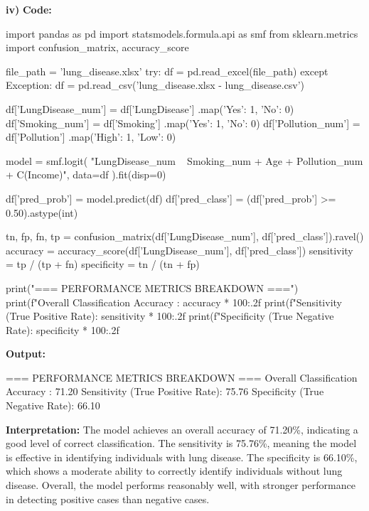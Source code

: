 \documentclass[12pt,a4paper]{article}
\begin{document}
\textbf{iv)}
\textbf{Code:}
\begin{codebox}
import pandas as pd
import statsmodels.formula.api as smf
from sklearn.metrics import confusion_matrix, accuracy_score

file_path = 'lung_disease.xlsx'
try:
    df = pd.read_excel(file_path)
except Exception:
    df = pd.read_csv('lung_disease.xlsx - lung_disease.csv')

df['LungDisease_num'] = df['LungDisease']
.map({'Yes': 1, 'No': 0})
df['Smoking_num'] = df['Smoking']
.map({'Yes': 1, 'No': 0})
df['Pollution_num'] = df['Pollution']
.map({'High': 1, 'Low': 0})

model = smf.logit(
    "LungDisease_num ~ Smoking_num + Age + Pollution_num + C(Income)",
    data=df
).fit(disp=0)

df['pred_prob'] = model.predict(df)
df['pred_class'] = (df['pred_prob'] >= 0.50).astype(int)

tn, fp, fn, tp = confusion_matrix(df['LungDisease_num'], df['pred_class']).ravel()
accuracy = accuracy_score(df['LungDisease_num'], 
df['pred_class'])
sensitivity = tp / (tp + fn)
specificity = tn / (tn + fp)

print("=== PERFORMANCE METRICS BREAKDOWN ===")
print(f"Overall Classification Accuracy : 
{accuracy * 100:.2f}%
print(f"Sensitivity (True Positive Rate): 
{sensitivity * 100:.2f}%
print(f"Specificity (True Negative Rate):
{specificity * 100:.2f}%
\end{codebox}

\textbf{Output:}
\begin{codebox}
=== PERFORMANCE METRICS BREAKDOWN ===
Overall Classification Accuracy : 71.20%
Sensitivity (True Positive Rate): 75.76%
Specificity (True Negative Rate): 66.10%
\end{codebox}

\textbf{Interpretation:}
The model achieves an overall accuracy of
71.20\%, indicating a good level of correct classification.
The sensitivity is 75.76\%, meaning the 
model is effective in identifying individuals with lung disease.
The specificity is 66.10\%, which shows a 
moderate ability to correctly identify 
individuals without lung disease.
Overall, the model performs reasonably well,
with stronger performance in detecting positive
cases than negative cases.
\end{document}
